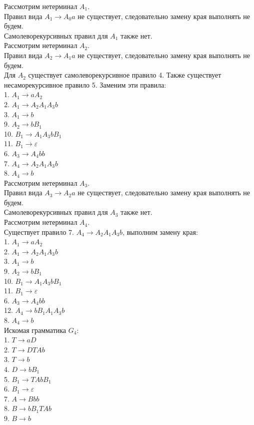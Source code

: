 \documentclass[a4paper,14pt]{extarticle}
\begin{document}
\begin{enumerate}[1.]
Рассмотрим нетерминал $A_1$.\\
Правил вида $A_1 \rightarrow A_0a$ не существует, 
следовательно замену края выполнять не будем.\\
Самолеворекурсивных правил для $A_1$ также нет.\\

Рассмотрим нетерминал $A_2$.\\
Правил вида $A_2 \rightarrow A_1a$ не существует, 
следовательно замену края выполнять не будем.\\
Для $A_2$ существует самолеворекурсивное правило 4. 
Также существует несаморекурсивное правило 5. 
Заменим эти правила:\\
1. $A_1 \rightarrow aA_2$\\
2. $A_1 \rightarrow A_2A_1A_3b$\\
3. $A_1 \rightarrow b$\\
9. $A_2 \rightarrow bB_1$\\
10. $B_1 \rightarrow A_1A_3bB_1$\\
11. $B_1 \rightarrow \varepsilon$\\
6. $A_3 \rightarrow A_4bb$\\
7. $A_4 \rightarrow A_2A_1A_3b$\\
8. $A_4 \rightarrow b$\\

Рассмотрим нетерминал $A_3$.\\
Правил вида $A_3 \rightarrow A_2a$ не существует, 
следовательно замену края выполнять не будем.\\
Самолеворекурсивных правил для $A_3$ также нет.\\

Рассмотрим нетерминал $A_4$.\\
Существует правило 7. $A_4 \rightarrow A_2A_1A_3b$, выполним замену края:\\
1. $A_1 \rightarrow aA_2$\\
2. $A_1 \rightarrow A_2A_1A_3b$\\
3. $A_1 \rightarrow b$\\
9. $A_2 \rightarrow bB_1$\\
10. $B_1 \rightarrow A_1A_3bB_1$\\
11. $B_1 \rightarrow \varepsilon$\\
6. $A_3 \rightarrow A_4bb$\\
12. $A_4 \rightarrow bB_1A_1A_3b$\\
8. $A_4 \rightarrow b$\\

Искомая грамматика $G_4$: \\
1. $T \rightarrow aD$\\
2. $T \rightarrow DTAb$\\
3. $T \rightarrow b$\\
4. $D \rightarrow bB_1$\\
5. $B_1 \rightarrow TAbB_1$\\
6. $B_1 \rightarrow \varepsilon$\\
7. $A \rightarrow Bbb$\\
8. $B \rightarrow bB_1TAb$\\
9. $B \rightarrow b$\\


\end{enumerate}
\end{document}
